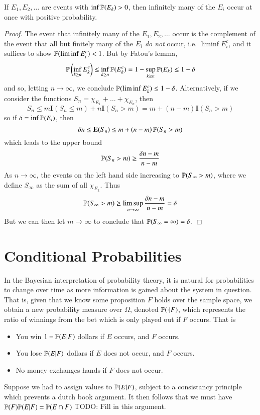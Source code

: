 \begin{theorem}
    If $E_1, E_2, \dots$ are events with $\inf \operatorname{\mathbb{P}}(E_k) > 0$, then infinitely many of the $E_i$ occur at once with positive probability.
\end{theorem}
\begin{proof}
    The event that infinitely many of the $E_1, E_2, \dots$ occur is the complement of the event that all but finitely many of the $E_i$ \emph{do not} occur, i.e. $\liminf E_i^c$, and it suffices to show $\operatorname{\mathbb{P}}(\liminf E_i^c) < 1$. But by Fatou's lemma,
    \[ \operatorname{\mathbb{P}} \left(\inf_{k \geq n} E_k^c \right) \leq \inf_{k \geq n} \operatorname{\mathbb{P}}(E_k^c) = 1 - \sup_{k \geq n} \operatorname{\mathbb{P}}(E_k) \leq 1 - \delta \]
    and so, letting $n \to \infty$, we conclude $\operatorname{\mathbb{P}}(\liminf E_k^c) \leq 1 - \delta$. Alternatively, if we consider the functions $S_n = \chi_{E_1} + \dots + \chi_{E_n}$, then
    \[ S_n \leq m \mathbf{I}(S_n \leq m) + n \mathbf{I}(S_n > m) = m + (n - m) \mathbf{I}(S_n > m) \]
    so if $\delta = \inf \operatorname{\mathbb{P}}(E_i)$, then
    \[ \delta n \leq \mathbf{E}(S_n) \leq m + (n - m) \operatorname{\mathbb{P}}(S_n > m) \]
    which leads to the upper bound
    \[ \operatorname{\mathbb{P}}(S_n > m) \geq \frac{\delta n - m}{n - m} \]
    As $n \to \infty$, the events on the left hand side increasing to $\operatorname{\mathbb{P}}(S_\infty > m)$, where we define $S_\infty$ as the sum of all $\chi_{E_k}$. Thus
    \[ \operatorname{\mathbb{P}}(S_\infty > m) \geq \limsup_{n \to \infty} \frac{\delta n - m}{n - m} = \delta \]
    But we can then let $m \to \infty$ to conclude that $\operatorname{\mathbb{P}}(S_\infty = \infty) = \delta$.
\end{proof}

\section{Conditional Probabilities}

In the Bayesian interpretation of probability theory, it is natural for probabilities to change over time as more information is gained about the system in question. That is, given that we know some proposition $F$ holds over the sample space, we obtain a new probability measure over $\Omega$, denoted $\mathbb{P}( \cdot | F)$, which represents the ratio of winnings from the bet which is only played out if $F$ occurs. That is
%
\begin{itemize}
    \item You win $1-\mathbb{P}(E|F)$ dollars if $E$ occurs, and $F$ occurs.
    \item You lose $\mathbb{P}(E|F)$ dollars if $E$ does not occur, and $F$ occurs.
    \item No money exchanges hands if $F$ does not occur.
\end{itemize}
%
Suppose we had to assign values to $\mathbb{P}(E|F)$, subject to a consistancy principle which prevents a dutch book argument. It then follows that we must have $\mathbb{P}(F) \mathbb{P}(E | F) = \mathbb{P}(E \cap F)$ TODO: Fill in this argument.

